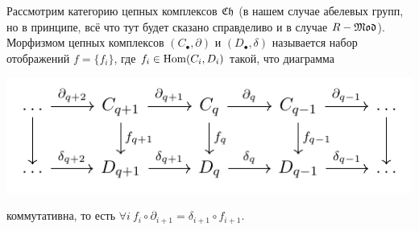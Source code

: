     Рассмотрим категорию цепных комплексов $\mathfrak{C}\mathfrak{h}$ (в нашем случае абелевых групп, но в принципе, всё что тут будет сказано справделиво и в случае $R-\mathfrak{M}\mathfrak{o}\mathfrak{d}$).
    Морфизмом цепных комплексов $(C_{\bullet}, \partial)$ и $(D_{\bullet}, \delta)$ называется набор отображений $f = \{ f_i \}$, где $f_i \in \operatorname{Hom}(C_i, D_i)$ такой, что
    диаграмма
    \begin{center}
        \includegraphics{lectures/0/pictures/cd_1}
    \end{center}
    коммутативна, то есть $\forall i \ f_{i} \circ \partial_{i + 1} = \delta_{i + 1} \circ f_{i + 1}$.

